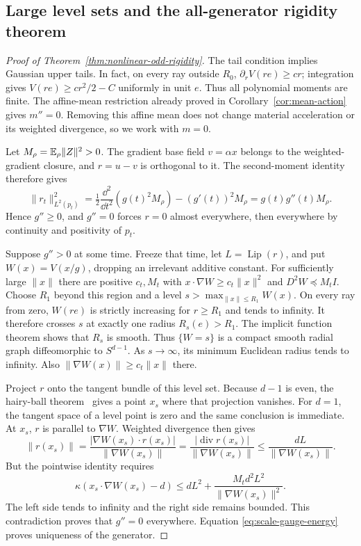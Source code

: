 \subsection{Large level sets and the all-generator rigidity theorem}

\begin{proof}[Proof of Theorem~\ref{thm:nonlinear-odd-rigidity}]
The tail condition implies Gaussian upper tails.  In fact, on every ray
outside $R_0$, $\partial_rV(re)\ge cr$; integration gives
$V(re)\ge cr^2/2-C$ uniformly in unit $e$.  Thus all polynomial moments
are finite.  The affine-mean restriction already proved in
Corollary~\ref{cor:mean-action} gives $m''=0$.  Removing this affine mean
does not change material acceleration or its weighted divergence, so
we work with $m=0$.

Let $M_\rho=\mathbb E_\rho\|Z\|^2>0$.  The gradient base field $v=\alpha x$
belongs to the weighted-gradient closure, and $r=u-v$ is orthogonal to
it.  The second-moment identity therefore gives
\begin{equation}
 \|r_t\|_{L^2(p_t)}^2
 =\tfrac12\frac{\dd^2}{\dd t^2}(g(t)^2M_\rho)
      -(g'(t))^2M_\rho
 =g(t)g''(t)M_\rho.
 \label{eq:scale-gauge-energy}
\end{equation}
Hence $g''\ge0$, and $g''=0$ forces $r=0$ almost everywhere, then
everywhere by continuity and positivity of $p_t$.

Suppose $g''>0$ at some time.  Freeze that time, let
$L=\operatorname{Lip}(r)$, and put $W(x)=V(x/g)$, dropping an irrelevant
additive constant.  For sufficiently large $\|x\|$ there are positive
$c_t,M_t$ with
$x\cdot\nabla W\ge c_t\|x\|^2$ and $D^2W\preceq M_tI$.
Choose $R_1$ beyond this region and a level
$s>\max_{\|x\|\le R_1}W(x)$.
On every ray from zero, $W(re)$ is strictly increasing for $r\ge R_1$
and tends to infinity.  It therefore crosses $s$ at exactly one radius
$R_s(e)>R_1$.  The implicit function theorem shows that $R_s$ is smooth.
Thus $\{W=s\}$ is a compact smooth radial graph diffeomorphic to
$S^{d-1}$.  As $s\to\infty$, its minimum Euclidean radius tends to
infinity.  Also $\|\nabla W(x)\|\ge c_t\|x\|$ there.

Project $r$ onto the tangent bundle of this level set.  Because $d-1$
is even, the hairy-ball theorem~\citep[Section~2.2]{hatcher2002algebraic}
gives a point $x_s$ where that projection vanishes.  For $d=1$, the
tangent space of a level point is zero and the same conclusion is
immediate.  At $x_s$, $r$ is parallel to $\nabla W$.  Weighted divergence
then gives
\begin{equation}
 \|r(x_s)\|
 =\frac{|\nabla W(x_s)\cdot r(x_s)|}{\|\nabla W(x_s)\|}
 =\frac{|\operatorname{div}r(x_s)|}{\|\nabla W(x_s)\|}
 \le\frac{dL}{\|\nabla W(x_s)\|}.
 \label{eq:levelset-pole}
\end{equation}
But the pointwise identity requires
\[
 \kappa(x_s\cdot\nabla W(x_s)-d)
 \le dL^2+
      \frac{M_td^2L^2}{\|\nabla W(x_s)\|^2}.
\]
The left side tends to infinity and the right side remains bounded.
This contradiction proves that $g''=0$ everywhere.  Equation
\eqref{eq:scale-gauge-energy} proves uniqueness of the generator.


\end{proof}
